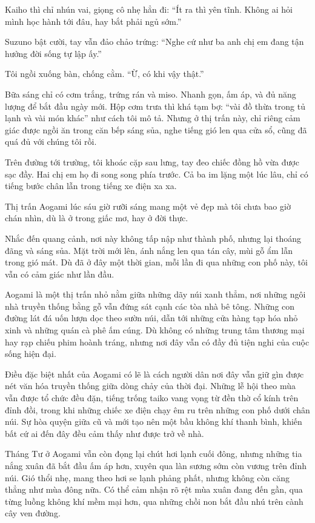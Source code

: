 \documentclass[../main.tex]{subfiles}
\begin{document}
Kaiho thì chỉ nhún vai, giọng cô nhẹ hẳn đi: ``Ít ra thì yên tĩnh. Không ai hỏi mình học hành tới đâu, hay bắt phải ngủ sớm.''

Suzuno bật cười, tay vẫn đảo chảo trứng: ``Nghe cứ như ba anh chị em đang tận hưởng đời sống tự lập ấy.''

Tôi ngồi xuống bàn, chống cằm. ``Ừ, có khi vậy thật.''

Bữa sáng chỉ có cơm trắng, trứng rán và miso. Nhanh gọn, ấm áp, và đủ năng lượng để bắt đầu ngày mới. Hộp cơm trưa thì khá tạm bợ: ``vài đồ thừa trong tủ lạnh và vài món khác'' như cách tôi mô tả. Nhưng ở thị trấn này, chỉ riêng cảm giác được ngồi ăn trong căn bếp sáng sủa, nghe tiếng gió len qua cửa sổ, cũng đã quá đủ với chúng tôi rồi.

\ct

Trên đường tới trường, tôi khoác cặp sau lưng, tay đeo chiếc đồng hồ vừa được sạc đầy. Hai chị em họ đi song song phía trước. Cả ba im lặng một lúc lâu, chỉ có tiếng bước chân lẫn trong tiếng xe điện xa xa.

Thị trấn Aogami lúc sáu giờ rưỡi sáng mang một vẻ đẹp mà tôi chưa bao giờ chán nhìn, dù là ở trong giấc mơ, hay ở đời thực.

Nhắc đến quang cảnh, nơi này không tấp nập như thành phố, nhưng lại thoáng đãng và sáng sủa. Mặt trời mới lên, ánh nắng len qua tán cây, mùi gỗ ẩm lẫn trong gió mát. Dù đã ở đây một thời gian, mỗi lần đi qua những con phố này, tôi vẫn có cảm giác như lần đầu.

Aogami là một thị trấn nhỏ nằm giữa những dãy núi xanh thẳm, nơi những ngôi nhà truyền thống bằng gỗ vẫn đứng sát cạnh các tòa nhà bê tông. Những con đường lát đá uốn lượn dọc theo sườn núi, dẫn tới những cửa hàng tạp hóa nhỏ xinh và những quán cà phê ấm cúng. Dù không có những trung tâm thương mại hay rạp chiếu phim hoành tráng, nhưng nơi đây vẫn có đầy đủ tiện nghi của cuộc sống hiện đại.

Điều đặc biệt nhất của Aogami có lẽ là cách người dân nơi đây vẫn giữ gìn được nét văn hóa truyền thống giữa dòng chảy của thời đại. Những lễ hội theo mùa vẫn được tổ chức đều đặn, tiếng trống taiko vang vọng từ đền thờ cổ kính trên đỉnh đồi, trong khi những chiếc xe điện chạy êm ru trên những con phố dưới chân núi. Sự hòa quyện giữa cũ và mới tạo nên một bầu không khí thanh bình, khiến bất cứ ai đến đây đều cảm thấy như được trở về nhà.

Tháng Tư ở Aogami vẫn còn đọng lại chút hơi lạnh cuối đông, nhưng những tia nắng xuân đã bắt đầu ấm áp hơn, xuyên qua làn sương sớm còn vương trên đỉnh núi. Gió thổi nhẹ, mang theo hơi se lạnh phảng phất, nhưng không còn căng thẳng như mùa đông nữa. Có thể cảm nhận rõ rệt mùa xuân đang đến gần, qua từng luồng không khí mềm mại hơn, qua những chồi non bắt đầu nhú trên cành cây ven đường.
\end{document}

